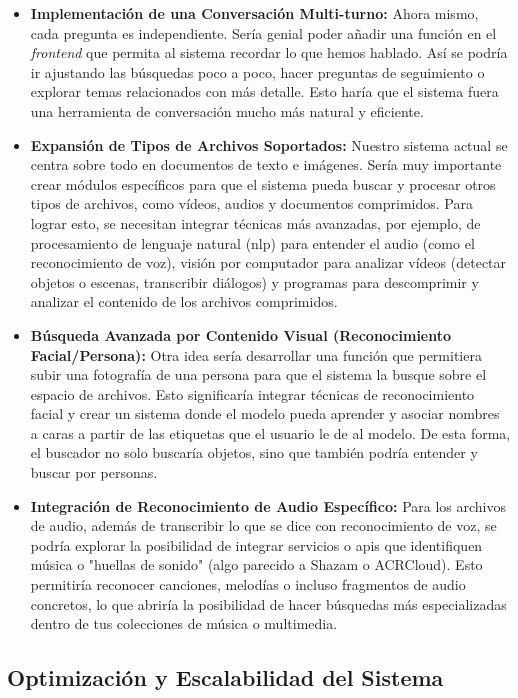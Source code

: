 \begin{itemize}
    \item \textbf{Implementación de una Conversación Multi-turno:} Ahora mismo, cada pregunta es independiente. Sería genial poder añadir una función en el \textit{frontend} que permita al sistema recordar lo que hemos hablado. Así se podría ir ajustando las búsquedas poco a poco, hacer preguntas de seguimiento o explorar temas relacionados con más detalle. Esto haría que el sistema fuera una herramienta de conversación mucho más natural y eficiente.
    \item \textbf{Expansión de Tipos de Archivos Soportados:} Nuestro sistema actual se centra sobre todo en documentos de texto e imágenes. Sería muy importante crear módulos específicos para que el sistema pueda buscar y procesar otros tipos de archivos, como vídeos, audios y documentos comprimidos. Para lograr esto, se necesitan integrar técnicas más avanzadas, por ejemplo, de procesamiento de lenguaje natural (\gls{nlp}) para entender el audio (como el reconocimiento de voz), visión por computador para analizar vídeos (detectar objetos o escenas, transcribir diálogos) y programas para descomprimir y analizar el contenido de los archivos comprimidos.
    \item \textbf{Búsqueda Avanzada por Contenido Visual (Reconocimiento Facial/Persona):} Otra idea sería desarrollar una función que permitiera subir una fotografía de una persona para que el sistema la busque sobre el espacio de archivos. Esto significaría integrar técnicas de reconocimiento facial y crear un sistema donde el modelo pueda aprender y asociar nombres a caras a partir de las etiquetas que el usuario le de al modelo. De esta forma, el buscador no solo buscaría objetos, sino que también podría entender y buscar por personas.
    \item \textbf{Integración de Reconocimiento de Audio Específico:} Para los archivos de audio, además de transcribir lo que se dice con reconocimiento de voz, se podría explorar la posibilidad de integrar servicios o \gls{api}s que identifiquen música o "huellas de sonido" (algo parecido a Shazam o ACRCloud). Esto permitiría reconocer canciones, melodías o incluso fragmentos de audio concretos, lo que abriría la posibilidad de hacer búsquedas más especializadas dentro de tus colecciones de música o multimedia.
\end{itemize}

\subsection{Optimización y Escalabilidad del Sistema}

